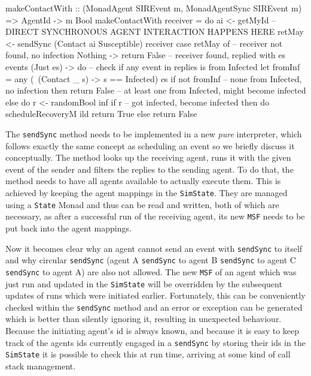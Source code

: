 \begin{HaskellCode}
makeContactWith :: (MonadAgent SIREvent m, MonadAgentSync SIREvent m) 
                => AgentId -> m Bool
makeContactWith receiver = do
  ai     <- getMyId
  -- DIRECT SYNCHRONOUS AGENT INTERACTION HAPPENS HERE
  retMay <- sendSync (Contact ai Susceptible) receiver
  case retMay of 
    -- receiver not found, no infection
    Nothing -> return False
    -- receiver found, replied with es events
    (Just es) -> do
      -- check if any event in replies is from Infected
      let fromInf = any (\ (Contact _ s) -> s == Infected) es
      if not fromInf
        -- none from Infected, no infection
        then return False
        -- at least one from Infected, might become infected
        else do
          r <- randomBool inf
          if r 
            -- got infected, become infected
            then do
              scheduleRecoveryM ild
              return True
            else return False
\end{HaskellCode}

The \texttt{sendSync} method needs to be implemented in a new \textit{pure} interpreter, which follows exactly the same concept as scheduling an event so we briefly discuss it conceptually. The method looks up the receiving agent, runs it with the given event of the sender and filters the replies to the sending agent. To do that, the method needs to have all agents available to actually execute them. This is achieved by keeping the agent mappings in the \texttt{SimState}. They are managed using a \texttt{State} Monad and thus can be read and written, both of which are necessary, as after a successful run of the receiving agent, its new \texttt{MSF} needs to be put back into the agent mappings.

Now it becomes clear why an agent cannot send an event with \texttt{sendSync} to itself and why circular \texttt{sendSync} (agent A \texttt{sendSync} to agent B \texttt{sendSync} to agent C \texttt{sendSync} to agent A) are also not allowed. The new \texttt{MSF} of an agent which was just run and updated in the \texttt{SimState} will be overridden by the subsequent updates of runs which were initiated earlier. Fortunately, this can be conveniently checked within the \texttt{sendSync} method and an error or exception can be generated which is better than silently ignoring it, resulting in unexpected behaviour. Because the initiating agent's id is always known, and because it is easy to keep track of the agents ids currently engaged in a \texttt{sendSync} by storing their ids in the \texttt{SimState} it is possible to check this at run time, arriving at some kind of call stack management.

